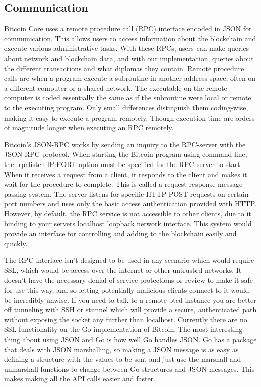 \documentclass[12pt]{article}
\begin{document}
\subsection{Communication}
Bitcoin Core uses a remote procedure call (RPC) interface encoded in JSON for communication. This allows users to access information about the blockchain and execute various administrative tasks. With these RPCs, users can make queries about network and blockchain data, and with our implementation, queries about the different transactions and what diplomas they contain. Remote procedure calls are when a program execute a subroutine in another address space, often on a different computer or a shared network. The executable on the remote computer is coded essentially the same as if the subroutine were local or remote to the executing program. Only small differences distinguish them coding-wise, making it easy to execute a program remotely. Though execution time are orders of magnitude longer when executing an RPC remotely. 

Bitcoin's JSON-RPC works by sending an inquiry to the RPC-server with the JSON-RPC protocol. When starting the Bitcoin program using command line, the -rpclisten:IP:PORT option must be specified for the RPC-server to start. When it receives a request from a client, it responds to the client and makes it wait for the procedure to complete. This is called a request-response message passing system. The server listens for specific HTTP-POST requests on certain port numbers and uses only the basic access authentication provided with HTTP. However, by default, the RPC service is not accessible to other clients, due to it binding to your servers localhost loopback network interface. This system would provide an interface for controlling and adding to the blockchain easily and quickly.

The RPC interface isn't designed to be used in any scenario which would require SSL, which would be access over the internet or other untrusted networks. It doesn't have the necessary denial of service protections or review to make it safe for use this way, and so letting potentially malicious clients connect to it would be incredibly unwise. If you need to talk to a remote btcd instance you are better off tunneling with SSH or stunnel which will provide a secure, authenticated path without exposing the socket any further than localhost. Currently there are no SSL functionality on the Go implementation of Bitcoin. The most interesting thing about using JSON and Go is how well Go handles JSON. Go has a package that deals with JSON marshalling, so making a JSON message is as easy as defining a structure with the values to be sent and just use the marshall and unmarshall functions to change between Go structures and JSON messages. This makes making all the API calls easier and faster.
\end{document}
